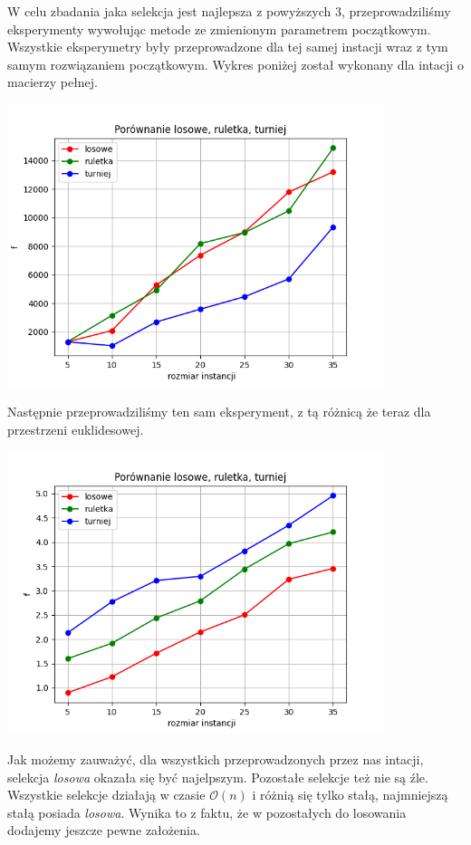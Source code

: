 \documentclass{article}
\begin{document}
    W celu zbadania jaka selekcja jest najlepsza z
    powyższych 3, przeprowadziliśmy eksperymenty wywołując
    metode ze zmienionym parametrem początkowym. Wszystkie
    eksperymetry były przeprowadzone dla tej samej instacji
    wraz z tym samym rozwiązaniem początkowym. Wykres poniżej
    został wykonany dla intacji o macierzy pełnej.

    \includegraphics[width=11cm]{../spr3img/Figure_1FULL.png}

    Następnie przeprowadziliśmy ten sam eksperyment, z tą różnicą
    że teraz dla przestrzeni euklidesowej.

   \includegraphics[width=11cm]{../spr3img/Figure_2.png}

    Jak możemy zauważyć, dla wszystkich przeprowadzonych
    przez nas intacji, selekcja \emph{losowa} okazała się być
    najelpszym. Pozostałe selekcje też nie są źle. Wszystkie
    selekcje działają w czasie $\mathcal{O}(n)$ i różnią się tylko
    stałą, najmniejszą stałą posiada \emph{losowa}. Wynika to z faktu,
    że w pozostałych do losowania dodajemy jeszcze pewne założenia.
\end{document}
